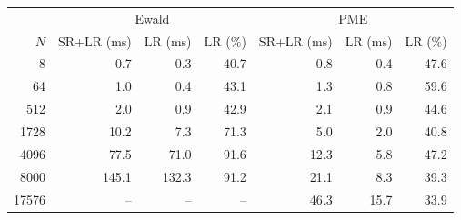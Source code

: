 \begin{tabular}{r | r r r | r r r}
\toprule
  \multicolumn{1}{c}{} & \multicolumn{3}{c}{Ewald} & \multicolumn{3}{c}{PME} \\ 
           $N$  &      SR+LR (ms)  &         LR (ms)  &         LR (\%)  &      SR+LR (ms)  &         LR (ms)  &         LR (\%) \\ 
\midrule
             8  &       \num{0.7}  &       \num{0.3}  &      \num{40.7}  &       \num{0.8}  &       \num{0.4}  &      \num{47.6} \\ 
            64  &       \num{1.0}  &       \num{0.4}  &      \num{43.1}  &       \num{1.3}  &       \num{0.8}  &      \num{59.6} \\ 
           512  &       \num{2.0}  &       \num{0.9}  &      \num{42.9}  &       \num{2.1}  &       \num{0.9}  &      \num{44.6} \\ 
          1728  &      \num{10.2}  &       \num{7.3}  &      \num{71.3}  &       \num{5.0}  &       \num{2.0}  &      \num{40.8} \\ 
          4096  &      \num{77.5}  &      \num{71.0}  &      \num{91.6}  &      \num{12.3}  &       \num{5.8}  &      \num{47.2} \\ 
          8000  &     \num{145.1}  &     \num{132.3}  &      \num{91.2}  &      \num{21.1}  &       \num{8.3}  &      \num{39.3} \\ 
         17576  &              --  &              --  &              --  &      \num{46.3}  &      \num{15.7}  &      \num{33.9} \\ 

\end{tabular}
